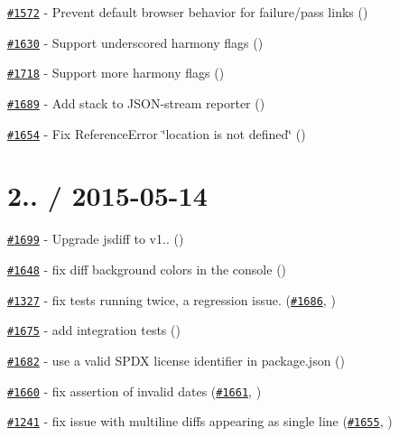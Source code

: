 \begin{DoxyItemize}
\item \href{https://github.com/mochajs/mocha/issues/1572}{\tt \#1572} -\/ Prevent default browser behavior for failure/pass links (\href{https://github.com/jschilli}{\tt })
\item \href{https://github.com/mochajs/mocha/issues/1630}{\tt \#1630} -\/ Support underscored harmony flags (\href{https://github.com/dominicbarnes}{\tt })
\item \href{https://github.com/mochajs/mocha/issues/1718}{\tt \#1718} -\/ Support more harmony flags (\href{https://github.com/slyg}{\tt })
\item \href{https://github.com/mochajs/mocha/issues/1689}{\tt \#1689} -\/ Add stack to J\+S\+O\+N-\/stream reporter (\href{https://github.com/jonathandelgado}{\tt })
\item \href{https://github.com/mochajs/mocha/issues/1654}{\tt \#1654} -\/ Fix {\ttfamily Reference\+Error} \char`\"{}location is not defined\char`\"{} (\href{https://github.com/jakemmarsh}{\tt })
\end{DoxyItemize}

\section*{2.. / 2015-\/05-\/14}


\begin{DoxyItemize}
\item \href{https://github.com/mochajs/mocha/issues/1699}{\tt \#1699} -\/ Upgrade jsdiff to v1.. (\href{https://github.com/nylen}{\tt })
\item \href{https://github.com/mochajs/mocha/issues/1648}{\tt \#1648} -\/ fix diff background colors in the console (\href{https://github.com/nylen}{\tt })
\item \href{https://github.com/mochajs/mocha/issues/1327}{\tt \#1327} -\/ fix tests running twice, a regression issue. (\href{https://github.com/mochajs/mocha/issues/1686}{\tt \#1686}, \href{https://github.com/danielstjules}{\tt })
\item \href{https://github.com/mochajs/mocha/issues/1675}{\tt \#1675} -\/ add integration tests (\href{https://github.com/danielstjules}{\tt })
\item \href{https://github.com/mochajs/mocha/issues/1682}{\tt \#1682} -\/ use a valid S\+P\+DX license identifier in package.\+json (\href{https://github.com/kemitchell}{\tt })
\item \href{https://github.com/mochajs/mocha/issues/1660}{\tt \#1660} -\/ fix assertion of invalid dates (\href{https://github.com/mochajs/mocha/issues/1661}{\tt \#1661}, \href{https://github.com/a8m}{\tt })
\item \href{https://github.com/mochajs/mocha/issues/1241}{\tt \#1241} -\/ fix issue with multiline diffs appearing as single line (\href{https://github.com/mochajs/mocha/issues/1655}{\tt \#1655}, \href{https://github.com/a8m}{\tt })
\end{DoxyItemize}

